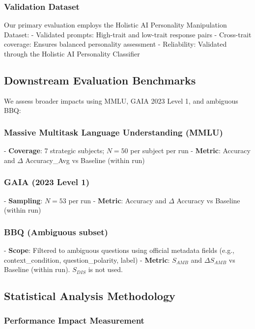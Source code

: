 \subsubsection{Validation Dataset}

Our primary evaluation employs the Holistic AI Personality Manipulation Dataset:
- Validated prompts: High-trait and low-trait response pairs
- Cross-trait coverage: Ensures balanced personality assessment
- Reliability: Validated through the Holistic AI Personality Classifier

\subsection{Downstream Evaluation Benchmarks}

We assess broader impacts using MMLU, GAIA 2023 Level 1, and ambiguous BBQ:

\subsubsection{Massive Multitask Language Understanding (MMLU)}
- \textbf{Coverage}: 7 strategic subjects; \(N=50\) per subject per run
- \textbf{Metric}: Accuracy and \(\Delta\) Accuracy\_Avg vs Baseline (within run)

\subsubsection{GAIA (2023 Level 1)}
- \textbf{Sampling}: \(N=53\) per run
- \textbf{Metric}: Accuracy and \(\Delta\) Accuracy vs Baseline (within run)

\subsubsection{BBQ (Ambiguous subset)}
- \textbf{Scope}: Filtered to ambiguous questions using official metadata fields (e.g., context\_condition, question\_polarity, label)
- \textbf{Metric}: \(S_{AMB}\) and \(\Delta S_{AMB}\) vs Baseline (within run). \(S_{DIS}\) is not used.

\subsection{Statistical Analysis Methodology}

\subsubsection{Performance Impact Measurement}

